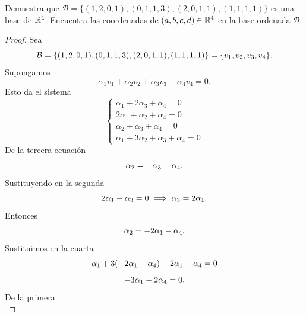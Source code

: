 \documentclass[12pt,a4paper]{article}
\begin{document}
    \begin{mdframed}[style=mdbluebox,frametitle={Ejercicio 2}]
        Demuestra que $\mathcal{B}=\{(1,2,0,1),(0,1,1,3),(2,0,1,1),(1,1,1,1)\}$ es una base de $\mathbb{R}^{4}$. Encuentra las coordenadas
        de $(a,b,c,d)\in\mathbb{R}^{4}$ en la base ordenada $\mathcal{B}$.
    \end{mdframed}

    \begin{proof}
        Sea
        \begin{equation*}
            \mathcal{B}=\{(1,2,0,1),(0,1,1,3),(2,0,1,1),(1,1,1,1)\}=\{v_{1},v_{2},v_{3},v_{4}\}.
        \end{equation*}
        Supongamos
        \begin{equation*}
            \alpha_{1}v_{1}+\alpha_{2}v_{2}+\alpha_{3}v_{3}+\alpha_{4}v_{4}=0.
        \end{equation*}
        Esto da el sistema
        \begin{equation*}
            \begin{cases}
                \alpha_{1}+2\alpha_{3}+\alpha_{4}=0\\
                2\alpha_{1}+\alpha_{2}+\alpha_{4}=0\\
                \alpha_{2}+\alpha_{3}+\alpha_{4}=0\\
                \alpha_{1}+3\alpha_{2}+\alpha_{3}+\alpha_{4}=0
            \end{cases}
        \end{equation*}
        De la tercera ecuación
        \begin{equation*}
            \alpha_{2}=-\alpha_{3}-\alpha_{4}.
        \end{equation*}
        Sustituyendo en la segunda
        \begin{equation*}
            2\alpha_{1}-\alpha_{3}=0\implies \alpha_{3}=2\alpha_{1}.
        \end{equation*}
        Entonces
        \begin{equation*}
            \alpha_{2}=-2\alpha_{1}-\alpha_{4}.
        \end{equation*}
        Sustituimos en la cuarta
        \begin{equation*}
            \alpha_{1}+3(-2\alpha_{1}-\alpha_{4})+2\alpha_{1}+\alpha_{4}=0
        \end{equation*}
        \begin{equation*}
            -3\alpha_{1}-2\alpha_{4}=0.
        \end{equation*}
        De la primera
        \begin{equation*}

\end{equation*}
\end{proof}
\end{document}
